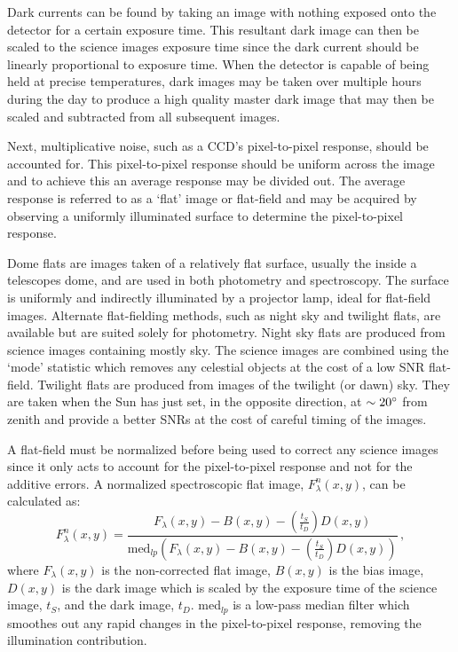 Dark currents can be found by taking an image with nothing exposed onto the detector for a certain exposure time. This resultant dark image can then be scaled to the science images exposure time since the dark current should be linearly proportional to exposure time. When the detector is capable of being held at precise temperatures, dark images may be taken over multiple hours during the day to produce a high quality master dark image that may then be scaled and subtracted from all subsequent images.

Next, multiplicative noise, such as a \gls{CCD}'s pixel-to-pixel response, should be accounted for. This pixel-to-pixel response should be uniform across the image and to achieve this an average response may be divided out. The average response is referred to as a `flat' image or flat-field and may be acquired by observing a uniformly illuminated surface to determine the pixel-to-pixel response.

Dome flats are images taken of a relatively flat surface, usually the inside a telescopes dome, and are used in both photometry and spectroscopy. The surface is uniformly and indirectly illuminated by a projector lamp, ideal for flat-field images. Alternate flat-fielding methods, such as night sky and twilight flats, are available but are suited solely for photometry.
Night sky flats are produced from science images containing mostly sky. The science images are combined using the `mode' statistic which removes any celestial objects at the cost of a low \gls{SNR} flat-field.
Twilight flats are produced from images of the twilight (or dawn) sky. They are taken when the Sun has just set, in the opposite direction, at $\sim 20\hbox{$^\circ$}$ from zenith and provide a better \glspl{SNR} at the cost of careful timing of the images.

A flat-field must be normalized before being used to correct any science images since it only acts to account for the pixel-to-pixel response and not for the additive errors. A  normalized spectroscopic flat image, $F^{n}_{\lambda}(x,y)$, can be calculated as:
\begin{equation} \label{eq:norm_flat}
    F^{n}_{\lambda}(x,y) = \frac{F_{\lambda}(x,y) - B(x,y) - (\frac{t_{S}}{t_{D}})D(x,y)}{\text{med}_{lp}(F_{\lambda}(x,y) - B(x,y) - (\frac{t_{S}}{t_{D}})D(x,y))}\,,
\end{equation}
where $F_{\lambda}(x,y)$ is the non-corrected flat image, $B(x,y)$ is the bias image, $D(x,y)$ is the dark image which is scaled by the exposure time of the science image, $t_{S}$, and the dark image, $t_{D}$. med$_{lp}$ is a low-pass median filter which smoothes out any rapid changes in the pixel-to-pixel response, removing the illumination contribution.

